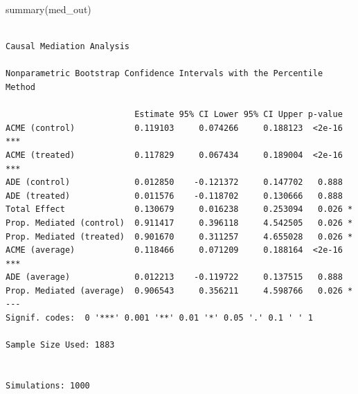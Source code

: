 \documentclass[
  letterpaper,
  DIV=11,
  numbers=noendperiod]{scrartcl}
\newenvironment{Shaded}{\begin{snugshade}}{\end{snugshade}}
\newcommand{\FunctionTok}[1]{\textcolor[rgb]{0.28,0.35,0.67}{#1}}
\newcommand{\NormalTok}[1]{\textcolor[rgb]{0.00,0.23,0.31}{#1}}
\begin{document}
\begin{Shaded}
\begin{Highlighting}[]
\FunctionTok{summary}\NormalTok{(med\_out)}
\end{Highlighting}
\end{Shaded}

\begin{verbatim}

Causal Mediation Analysis 

Nonparametric Bootstrap Confidence Intervals with the Percentile Method

                          Estimate 95% CI Lower 95% CI Upper p-value    
ACME (control)            0.119103     0.074266     0.188123  <2e-16 ***
ACME (treated)            0.117829     0.067434     0.189004  <2e-16 ***
ADE (control)             0.012850    -0.121372     0.147702   0.888    
ADE (treated)             0.011576    -0.118702     0.130666   0.888    
Total Effect              0.130679     0.016238     0.253094   0.026 *  
Prop. Mediated (control)  0.911417     0.396118     4.542505   0.026 *  
Prop. Mediated (treated)  0.901670     0.311257     4.655028   0.026 *  
ACME (average)            0.118466     0.071209     0.188164  <2e-16 ***
ADE (average)             0.012213    -0.119722     0.137515   0.888    
Prop. Mediated (average)  0.906543     0.356211     4.598766   0.026 *  
---
Signif. codes:  0 '***' 0.001 '**' 0.01 '*' 0.05 '.' 0.1 ' ' 1

Sample Size Used: 1883 


Simulations: 1000 
\end{verbatim}
\end{document}
